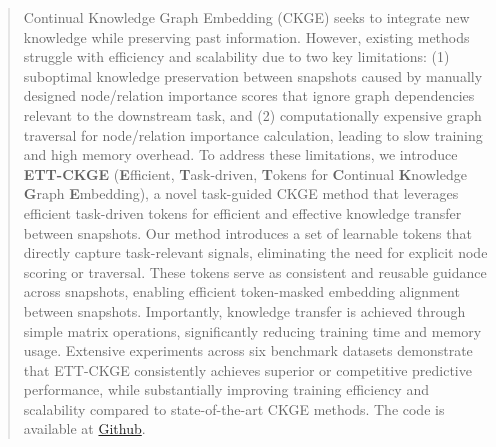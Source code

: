 \documentclass[runningheads]{llncs}
\begin{document}
\maketitle              %
\sloppy

\begin{abstract}
Continual Knowledge Graph Embedding (CKGE) seeks to integrate new knowledge while preserving past information. However, existing methods struggle with efficiency and scalability due to two key limitations: (1) suboptimal knowledge preservation between snapshots caused by manually designed node/relation importance scores that ignore graph dependencies relevant to the downstream task, and (2) computationally expensive graph traversal for node/relation importance calculation, leading to slow training and high memory overhead. To address these limitations, we introduce \textbf{ETT-CKGE} (\textbf{E}fficient, \textbf{T}ask-driven, \textbf{T}okens for \textbf{C}ontinual \textbf{K}nowledge \textbf{G}raph \textbf{E}mbedding), a novel task-guided CKGE method that leverages efficient task-driven tokens for efficient and effective knowledge transfer between snapshots. Our method introduces a set of learnable tokens that directly capture task-relevant signals, eliminating the need for explicit node scoring or traversal. These tokens serve as consistent and reusable guidance across snapshots, enabling efficient token-masked embedding alignment between snapshots. Importantly, knowledge transfer is achieved through simple matrix operations, significantly reducing training time and memory usage. Extensive experiments across six benchmark datasets demonstrate that ETT-CKGE consistently achieves superior or competitive predictive performance, while substantially improving training efficiency and scalability compared to state-of-the-art CKGE methods. The code is available at \href{https://github.com/lijingzhu1/ETT-CKGE/tree/main}{Github}.

\end{abstract}
\end{document}
